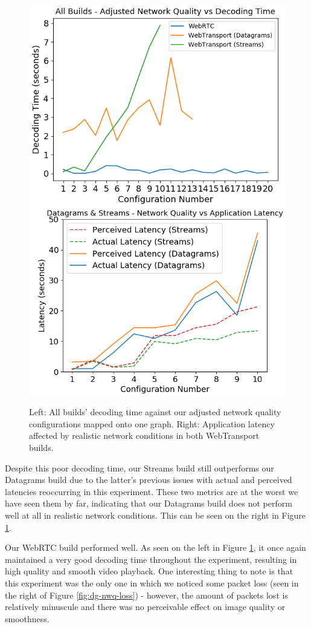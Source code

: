 \begin{figure}[h]
    \centering
    \includegraphics[width=0.49\linewidth]{images/combo/all-nwq-dec.png}
    \includegraphics[width=0.49\linewidth]{images/combo/dg-streams-nwq-lat.png}
    \caption{Left: All builds’ decoding time against our adjusted network quality configurations mapped onto one graph. Right: Application latency affected by realistic network conditions in both WebTransport builds.}
    \label{fig:all-nwq-dec} 
\end{figure}

Despite this poor decoding time, our Streams build still outperforms our Datagrams build due to the latter's previous issues with actual and perceived latencies reoccurring in this experiment. These two metrics are at the worst we have seen them by far, indicating that our Datagrams build does not perform well at all in realistic network conditions. This can be seen on the right in Figure \ref{fig:all-nwq-dec}.


Our WebRTC build performed well. As seen on the left in Figure \ref{fig:all-nwq-dec}, it once again maintained a very good decoding time throughout the experiment, resulting in high quality and smooth video playback. One interesting thing to note is that this experiment was the only one in which we noticed some packet loss (seen in the right of Figure \ref{fig:dg-nwq-loss}) - however, the amount of packets lost is relatively minuscule and there was no perceivable effect on image quality or smoothness. 

